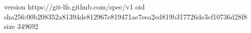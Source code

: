 version https://git-lfs.github.com/spec/v1
oid sha256:00b208352a81394de812967e819471ae7eea2ed819b317726de3cf10736d28f8
size 349692
